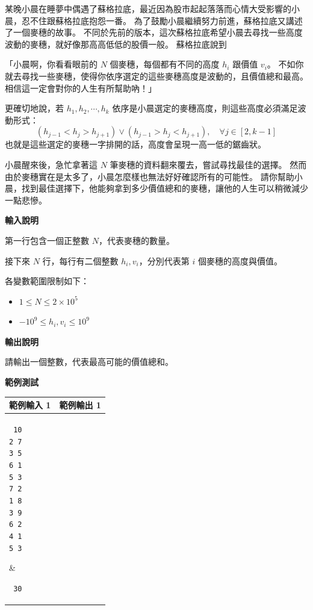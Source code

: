     某晚小晨在睡夢中偶遇了蘇格拉底，最近因為股市起起落落而心情大受影響的小晨，忍不住跟蘇格拉底抱怨一番。
    為了鼓勵小晨繼續努力前進，蘇格拉底又講述了一個麥穗的故事。
    不同於先前的版本，這次蘇格拉底希望小晨去尋找一些高度波動的麥穗，就好像那高高低低的股價一般。
    蘇格拉底說到

    「小晨啊，你看看眼前的 $N$ 個麥穗，每個都有不同的高度 $h_i$ 跟價值 $v_i$。
    不如你就去尋找一些麥穗，使得你依序選定的這些麥穗高度是波動的，且價值總和最高。
    相信這一定會對你的人生有所幫助吶！」

    更確切地說，若 $h_1, h_2, \cdots, h_k$ 依序是小晨選定的麥穗高度，則這些高度必須滿足波動形式：
    $$
        \left(h_{j-1} < h_j > h_{j+1}\right) \vee 
        \left(h_{j-1} > h_j < h_{j+1}\right)
        ,\quad \forall j \in [2, k-1]
    $$
    也就是這些選定的麥穗一字排開的話，高度會呈現一高一低的鋸齒狀。

    小晨醒來後，急忙拿著這 $N$ 筆麥穗的資料翻來覆去，嘗試尋找最佳的選擇。
    然而由於麥穗實在是太多了，小晨怎麼樣也無法好好確認所有的可能性。
    請你幫助小晨，找到最佳選擇下，他能夠拿到多少價值總和的麥穗，讓他的人生可以稍微減少一點悲慘。

    \textbf{輸入說明}

    第一行包含一個正整數 $N$，代表麥穗的數量。

    接下來 $N$ 行，每行有二個整數 $h_i, v_i$，分別代表第 $i$ 個麥穗的高度與價值。

    各變數範圍限制如下：
    \begin{itemize}
        \item $1 \le N \le 2\times 10^5$
        \item $-10^9 \le h_i, v_i \le 10^9$
    \end{itemize}

    \textbf{輸出說明}

    請輸出一個整數，代表最高可能的價值總和。

    \textbf{範例測試}

    \begin{tabular}{|m{7cm}|m{7cm}|}
        \hline
        範例輸入 1 & 範例輸出 1 \\
        \hline
        \parbox[t]{7cm} %
        { \tt
        10 \\
        2 7 \\
        3 5 \\
        6 1 \\
        5 3 \\
        7 2 \\
        1 8 \\
        3 9 \\
        6 2 \\
        4 1 \\
        5 3 \\
        } &
        \parbox[t]{7cm}
        { \tt
        30 \\
        } \\
        \hline
    \end{tabular}

